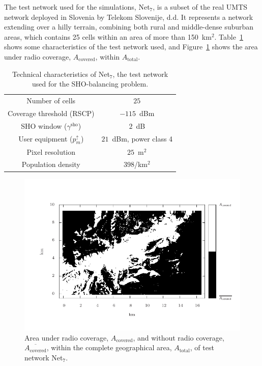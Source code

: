 The test network used for the simulations, Net$_{7}$, is a subset
of the real UMTS network deployed in Slovenia by Telekom Slovenije,
d.d. It represents a network extending over a hilly terrain, combining
both rural and middle-dense suburban areas, which contains 25 cells
within an area of more than 150~km$^{2}$. Table~\ref{tab:07-Test_network_properties}
shows some characteristics of the test network used, and Figure~\ref{fig:07-Coverage_areas}
shows the area under radio coverage, $A_{\mathrm{covered}}$, within
$A_{\mathrm{total}}$.

\begin{table}[h]
\caption{Technical characteristics of Net$_{7}$, the test network used for
the SHO-balancing problem. \label{tab:07-Test_network_properties}}


\centering

\begin{tabular}{cc}
\hline 
Number of cells & $25$\tabularnewline
Coverage threshold (RSCP) & $-115$~dBm\tabularnewline
SHO window ($\gamma^{\mathrm{sho}}$) & $2$~dB\tabularnewline
User equipment ($p_{m}^{\uparrow}$) & $21$~dBm, power class 4\tabularnewline
Pixel resolution & $25$~m$^{2}$\tabularnewline
Population density & $398$/km$^{2}$\tabularnewline
\hline 
\end{tabular}
\end{table}


\begin{figure}
\centering

\includegraphics[width=1\textwidth]{07-experimental_evaluation-sho_balancing/img/coverage_area}

\caption{Area under radio coverage, $A_{\mathrm{covered}}$, and without radio
coverage, $\overline{A_{\mathrm{covered}}}$, within the complete
geographical area, $A_{\mathrm{total}}$, of test network Net$_{7}$.\label{fig:07-Coverage_areas}}
\end{figure}



